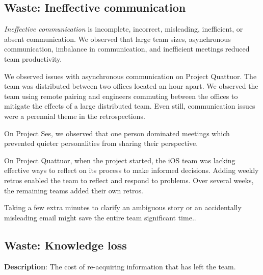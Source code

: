 \subsection{Waste: Ineffective communication}
\textit{Ineffective communication} is incomplete, incorrect, misleading, inefficient, or absent communication. We observed that large team sizes, asynchronous communication, imbalance in communication, and inefficient meetings reduced team productivity.


We observed issues with asynchronous communication on Project Quattuor. The team was distributed between two offices located an hour apart. We observed the team using remote pairing and engineers commuting between the offices to mitigate the effects of a large distributed team. Even still, communication issues were a perennial theme in the retrospections.


On Project Ses, we observed that one person dominated meetings which prevented quieter personalities from sharing their perspective. 


On Project Quattuor, when the project started, the iOS team was lacking effective ways to reflect on its process to make informed decisions. Adding weekly retros enabled the team to reflect and respond to problems. Over several weeks, the remaining teams added their own retros. 


Taking a few extra minutes to clarify an ambiguous story or an accidentally misleading email might save the entire team significant time..












\subsection{Waste: Knowledge loss}
\textbf{Description}: The cost of re-acquiring information that has left the team.


